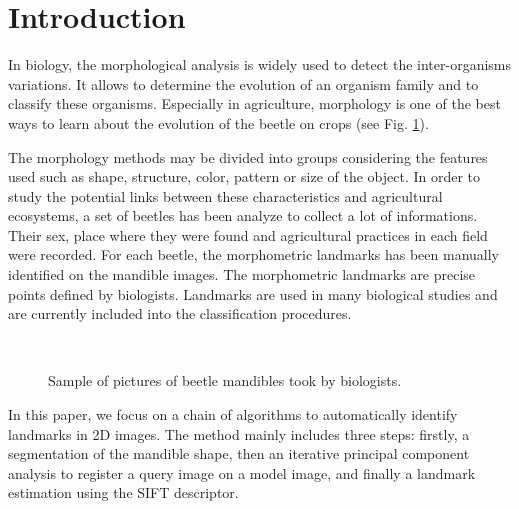 \documentclass[twoside,twocolumn,10pt]{article}
\begin{document}


\section{Introduction}

\copyrightspace
In biology, the morphological analysis is widely used to detect the inter-organisms variations.
It allows to determine the evolution of an organism family and to classify these
organisms. Especially in agriculture, morphology is one of the best ways
to learn about the evolution of the beetle on crops (see Fig. \ref{figparts}).

The morphology methods may be divided into groups considering the features used
such as shape, structure, color, pattern or size of the
object. In order to study the potential links between these
characteristics and agricultural ecosystems, a set of beetles has been
analyze to collect a lot of informations. Their sex, place where they were
found and agricultural practices in each field were recorded. For each
beetle, the morphometric landmarks has been manually identified on the mandible images.
The morphometric landmarks are precise points defined by biologists. Landmarks are
used in many biological studies and are currently included
into the classification procedures.

\begin{figure}[h]
\centering
{}~~
\caption{Sample of pictures of beetle mandibles took by biologists.}
\label{figparts}
\end{figure}

In this paper, we focus on a chain of algorithms to automatically identify  landmarks in 2D images. The method
mainly includes three steps: firstly, a segmentation of the mandible shape,
then an iterative principal component analysis
to register a query image on a model image, and finally a
landmark estimation using the SIFT descriptor.\\
\end{document}
